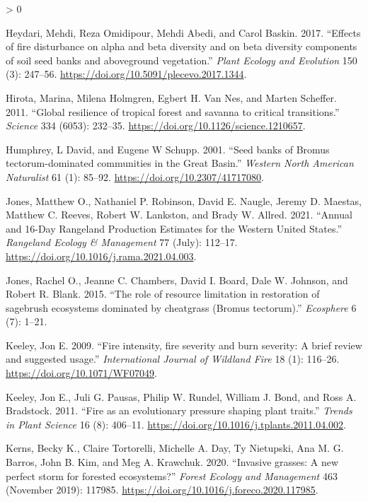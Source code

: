 \documentclass[
  12pt,
]{article}
\newlength{\cslhangindent}
\newenvironment{CSLReferences}[2] %
 {%
  \setlength{\parindent}{0pt}
  \ifodd #1 \everypar{\setlength{\hangindent}{\cslhangindent}}\ignorespaces\fi
  \ifnum #2 > 0
  \setlength{\parskip}{#2\baselineskip}
  \fi
 }%
 {}
\begin{document}
\begin{CSLReferences}{1}{0}
\leavevmode\hypertarget{ref-Heydari2017}{}%
Heydari, Mehdi, Reza Omidipour, Mehdi Abedi, and Carol Baskin. 2017.
{``{Effects of fire disturbance on alpha and beta diversity and on beta
diversity components of soil seed banks and aboveground vegetation}.''}
\emph{Plant Ecology and Evolution} 150 (3): 247--56.
\url{https://doi.org/10.5091/plecevo.2017.1344}.

\leavevmode\hypertarget{ref-Hirota2011}{}%
Hirota, Marina, Milena Holmgren, Egbert H. Van Nes, and Marten Scheffer.
2011. {``{Global resilience of tropical forest and savanna to critical
transitions}.''} \emph{Science} 334 (6053): 232--35.
\url{https://doi.org/10.1126/science.1210657}.

\leavevmode\hypertarget{ref-Humphrey2001}{}%
Humphrey, L David, and Eugene W Schupp. 2001. {``{Seed banks of Bromus
tectorum-dominated communities in the Great Basin}.''} \emph{Western
North American Naturalist} 61 (1): 85--92.
\url{https://doi.org/10.2307/41717080}.

\leavevmode\hypertarget{ref-Jones2021}{}%
Jones, Matthew O., Nathaniel P. Robinson, David E. Naugle, Jeremy D.
Maestas, Matthew C. Reeves, Robert W. Lankston, and Brady W. Allred.
2021. {``Annual and 16-{Day} {Rangeland} {Production} {Estimates} for
the {Western} {United} {States}.''} \emph{Rangeland Ecology \&
Management} 77 (July): 112--17.
\url{https://doi.org/10.1016/j.rama.2021.04.003}.

\leavevmode\hypertarget{ref-Jones2015}{}%
Jones, Rachel O., Jeanne C. Chambers, David I. Board, Dale W. Johnson,
and Robert R. Blank. 2015. {``{The role of resource limitation in
restoration of sagebrush ecosystems dominated by cheatgrass (Bromus
tectorum)}.''} \emph{Ecosphere} 6 (7): 1--21.

\leavevmode\hypertarget{ref-Keeley2009}{}%
Keeley, Jon E. 2009. {``{Fire intensity, fire severity and burn
severity: A brief review and suggested usage}.''} \emph{International
Journal of Wildland Fire} 18 (1): 116--26.
\url{https://doi.org/10.1071/WF07049}.

\leavevmode\hypertarget{ref-Keeley2011}{}%
Keeley, Jon E., Juli G. Pausas, Philip W. Rundel, William J. Bond, and
Ross A. Bradstock. 2011. {``{Fire as an evolutionary pressure shaping
plant traits}.''} \emph{Trends in Plant Science} 16 (8): 406--11.
\url{https://doi.org/10.1016/j.tplants.2011.04.002}.

\leavevmode\hypertarget{ref-Kerns2020}{}%
Kerns, Becky K., Claire Tortorelli, Michelle A. Day, Ty Nietupski, Ana
M. G. Barros, John B. Kim, and Meg A. Krawchuk. 2020. {``{Invasive
grasses: A new perfect storm for forested ecosystems?}''} \emph{Forest
Ecology and Management} 463 (November 2019): 117985.
\url{https://doi.org/10.1016/j.foreco.2020.117985}.


\end{CSLReferences}
\end{document}
